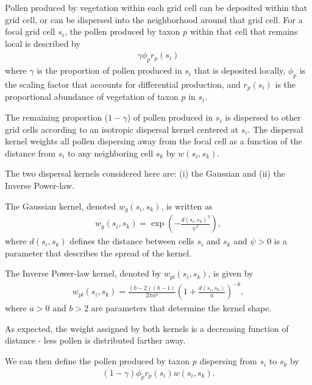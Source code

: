 \documentclass[12pt]{article}
\begin{document}
Pollen produced by vegetation within each grid cell can be deposited
within that grid cell, or can be dispersed into the neighborhood
around that grid cell. For a focal grid cell $s_i$, the pollen
produced by taxon $p$ within that cell that remains local is described
by
\begin{align}
\gamma \phi_p r_p(s_i)
\end{align} 
where $\gamma$ is the proportion of pollen produced in $s_i$ that is
deposited locally, $\phi_p$ is the scaling factor that accounts for
differential production, and $r_p(s_i)$ is the proportional abundance
of vegetation of taxon $p$ in $s_i$.

The remaining proportion ($1-\gamma$) of pollen produced in $s_i$ is
dispersed to other grid cells according to an isotropic dispersal
kernel centered at $s_i$. The dispersal kernel weights all pollen
dispersing away from the focal cell as a function of the distance from
$s_i$ to any neighboring cell $s_k$ by $w(s_i, s_k)$. 

The two dispersal kernels considered here are: (i) the Gaussian and
(ii) the Inverse Power-law.

The Gaussian kernel, denoted $w_g(s_i,s_k)$, is written as
\begin{align}
w_g(s_i, s_k) = \exp\left( - \frac{d(s_i, s_k)^2}{\psi^2} \right),
\end{align}
where $d(s_i,s_k)$ defines the distance between cells $s_i$ and $s_k$
and $\psi>0$ is a parameter that describes the spread of the kernel. 

The Inverse Power-law kernel, denoted by $w_{pl}(s_i,s_k)$, is given by
\begin{align}
w_{pl}(s_i, s_k) = \frac{(b-2)(b-1)}{2 \pi a^2} \left( 1 + \frac{d(s_i, s_k)}{a} \right)^{-b},
\end{align}
where $a>0$ and $b>2$ are parameters that determine the kernel shape. 

As expected, the weight assigned by both kernels is a decreasing function
of distance - less pollen is distributed farther away.

 
We can then define the pollen produced by taxon $p$ dispersing from
$s_i$ to $s_k$ by
\begin{align}
(1-\gamma) \phi_p r_p(s_i) w(s_i, s_k).
\end{align}
\end{document}
